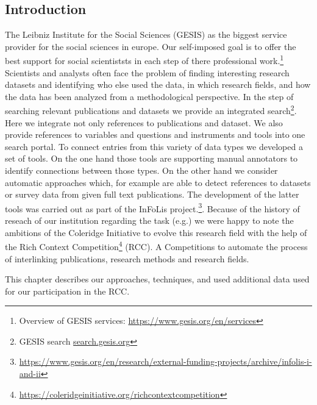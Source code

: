 \subsection {Introduction}
The Leibniz Institute for the Social Sciences (GESIS) as the biggest service provider for the social sciences in europe.
Our self-imposed goal is to offer the best support for social scientiststs in each step of there professional work.\footnote{Overview of GESIS services: \url{https://www.gesis.org/en/services}}
Scientists and analysts often face the problem of finding interesting research datasets and identifying who else used the data, in which research fields, and how the data has been analyzed from a methodological perspective.
In the step of searching relevant publications and datasets we provide an integrated search\footnote{GESIS search \url{search.gesis.org}}.
Here we integrate not only references to publications and dataset.
We also provide references to variables and questions and instruments and tools into one search portal.
To connect entries from this variety of data types we developed a set of tools.
On the one hand those tools are supporting manual annotators to identify connections between those types.
On the other hand we consider automatic approaches which, for example are able to detect references to datasets or survey data from given full text publications.
The development of the latter tools was carried out as part of the InFoLis project.\footnote{\url{https://www.gesis.org/en/research/external-funding-projects/archive/infolis-i-and-ii}}.
Because of the history of reseach of our institution regarding the task (e.g.\cite{boland2012identifying,ghavimi2016semi}) we were happy to note the ambitions of the Coleridge Initiative to evolve this research field with the help of the Rich Context Competition\footnote{\url{https://coleridgeinitiative.org/richcontextcompetition}} (RCC).
A Competitions to automate the process of interlinking publications, research methods and research fields.

This chapter describes our approaches, techniques, and used additional data used for our participation in the RCC.

